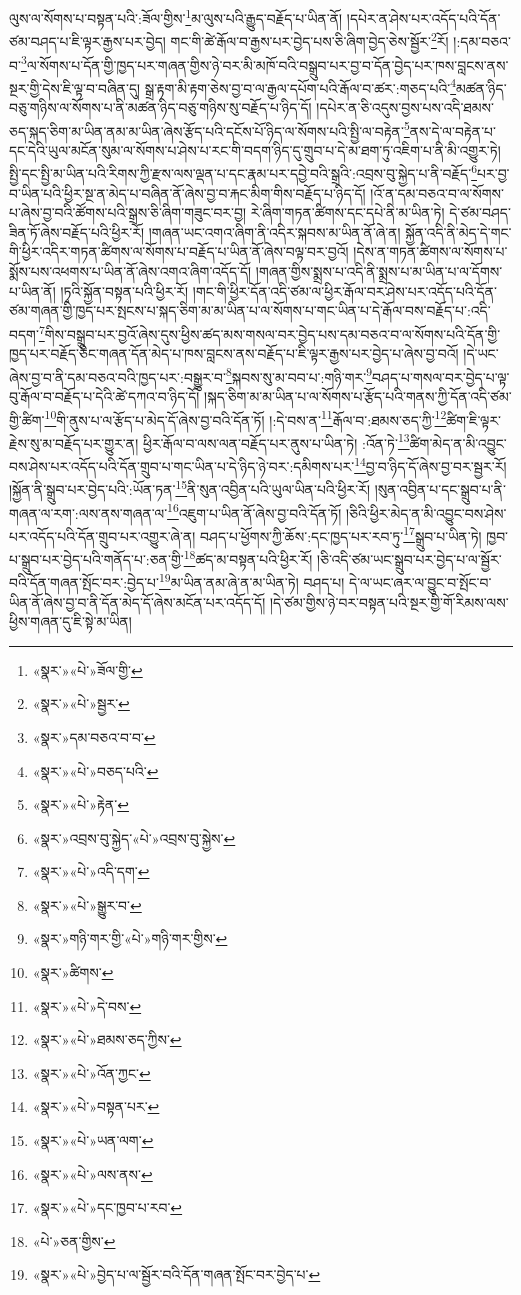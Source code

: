 ལུས་ལ་སོགས་པ་བསྟན་པའི་:ཟོལ་གྱིས་\footnote{«སྣར་»«པེ་»ཟོལ་གྱི་}མ་ལུས་པའི་རྒྱུད་བརྗོད་པ་ཡིན་ནོ། །དཔེར་ན་ཤེས་པར་འདོད་པའི་དོན་ཙམ་བཤད་པ་ཇི་ལྟར་རྒྱས་པར་བྱེད། གང་གི་ཚེ་རྒོལ་བ་རྒྱས་པར་བྱེད་པས་ཅི་ཞིག་བྱེད་ཅེས་སྦྱོར་\footnote{«སྣར་»«པེ་»སྦྱར་}རོ། །:དམ་བཅའ་བ་\footnote{«སྣར་»དམ་བཅའ་བ་བ་}ལ་སོགས་པ་དོན་གྱི་ཁྱད་པར་གཞན་གྱིས་ཉེ་བར་མི་མཁོ་བའི་བསྒྲུབ་པར་བྱ་བ་དོན་བྱེད་པར་ཁས་བླངས་ནས་སྔར་གྱི་དེས་ཇི་ལྟ་བ་བཞིན་དུ། སྒྲ་རྟག་མི་རྟག་ཅེས་བྱ་བ་ལ་རྒྱལ་དཔོག་པའི་རྒོལ་བ་ཚར་:གཅད་པའི་\footnote{«སྣར་»«པེ་»བཅད་པའི་}མཚན་ཉིད་བཅུ་གཉིས་ལ་སོགས་པ་ནི་མཚན་ཉིད་བཅུ་གཉིས་སུ་བརྗོད་པ་ཉིད་དོ། །དཔེར་ན་ཅི་འདུས་བྱས་པས་འདི་ཐམས་ཅད་སྐད་ཅིག་མ་ཡིན་ནམ་མ་ཡིན་ཞེས་རྩོད་པའི་དངོས་པོ་ཉིད་ལ་སོགས་པའི་སྤྱི་ལ་བརྟེན་\footnote{«སྣར་»«པེ་»རྟེན་}ནས་དེ་ལ་བརྟེན་པ་དང་དེའི་ཡུལ་མངོན་སུམ་ལ་སོགས་པ་ཤེས་པ་རང་གི་བདག་ཉིད་དུ་གྲུབ་པ་དེ་མ་ཐག་ཏུ་འཇིག་པ་ནི་མི་འགྱུར་ཏེ། སྤྱི་དང་སྤྱི་མ་ཡིན་པའི་རིགས་ཀྱི་རྫས་ལས་ལྡན་པ་དང་རྣམ་པར་དབྱེ་བའི་སྒྲའི་:འབྲས་བུ་སྐྱེད་པ་ནི་བརྗོད་\footnote{«སྣར་»འབྲས་བུ་སྐྱེད་«པེ་»འབྲས་བུ་སྐྱེས་}པར་བྱ་བ་ཡིན་པའི་ཕྱིར་སྔ་ན་མེད་པ་བཞིན་ནོ་ཞེས་བྱ་བ་རྐང་མིག་གིས་བརྗོད་པ་ཉིད་དོ། །འོ་ན་དམ་བཅའ་བ་ལ་སོགས་པ་ཞེས་བྱ་བའི་ཚོགས་པའི་སྒྲས་ཅི་ཞིག་གཟུང་བར་བྱ། རེ་ཞིག་གཏན་ཚིགས་དང་དཔེ་ནི་མ་ཡིན་ཏེ། དེ་ཙམ་བཤད་ཟིན་ཏོ་ཞེས་བརྗོད་པའི་ཕྱིར་རོ། །གཞན་ཡང་འགའ་ཞིག་ནི་འདིར་སྐབས་མ་ཡིན་ནོ་ཞེ་ན། སྐྱོན་འདི་ནི་མེད་དེ་གང་གི་ཕྱིར་འདིར་གཏན་ཚིགས་ལ་སོགས་པ་བརྗོད་པ་ཡིན་ནོ་ཞེས་བལྟ་བར་བྱའོ། །དེས་ན་གཏན་ཚིགས་ལ་སོགས་པ་སྨོས་པས་འཕགས་པ་ཡིན་ནོ་ཞེས་འགའ་ཞིག་འདོད་དོ། །གཞན་གྱིས་སྨྲས་པ་འདི་ནི་སྨྲས་པ་མ་ཡིན་པ་ལ་དོགས་པ་ཡིན་ནོ། །ཏྭའི་སྐྱོན་བསྟན་པའི་ཕྱིར་རོ། །གང་གི་ཕྱིར་དོན་འདི་ཙམ་ལ་ཕྱིར་རྒོལ་བར་ཤེས་པར་འདོད་པའི་དོན་ཙམ་གཞན་གྱི་ཁྱད་པར་སྤངས་པ་སྐད་ཅིག་མ་མ་ཡིན་པ་ལ་སོགས་པ་གང་ཡིན་པ་དེ་རྒོལ་བས་བརྗོད་པ་:འདི་བདག་\footnote{«སྣར་»«པེ་»འདི་དག་}གིས་བསྒྲུབ་པར་བྱའོ་ཞེས་དུས་ཕྱིས་ཚད་མས་གསལ་བར་བྱེད་པས་དམ་བཅའ་བ་ལ་སོགས་པའི་དོན་གྱི་ཁྱད་པར་བརྗོད་ཅིང་གཞན་དོན་མེད་པ་ཁས་བླངས་ནས་བརྗོད་པ་ཇི་ལྟར་རྒྱས་པར་བྱེད་པ་ཞེས་བྱ་བའོ། །དེ་ཡང་ཞེས་བྱ་བ་ནི་དམ་བཅའ་བའི་ཁྱད་པར་:བསྒྱུར་བ་\footnote{«སྣར་»«པེ་»སྒྱུར་བ་}སྐབས་སུ་མ་བབ་པ་:གཉི་གར་\footnote{«སྣར་»གཉི་གར་གྱི་«པེ་»གཉི་གར་གྱིས་}བཤད་པ་གསལ་བར་བྱེད་པ་ལྟ་བུ་རྒོལ་བ་བརྗོད་པ་དེའི་ཚེ་དཀའ་བ་ཉིད་དོ། །སྐད་ཅིག་མ་མ་ཡིན་པ་ལ་སོགས་པ་རྩོད་པའི་གནས་ཀྱི་དོན་འདི་ཙམ་གྱི་ཚིག་\footnote{«སྣར་»ཚིགས་}གི་ནུས་པ་ལ་རྩོད་པ་མེད་དོ་ཞེས་བྱ་བའི་དོན་ཏོ། །:དེ་བས་ན་\footnote{«སྣར་»«པེ་»དེ་བས་}རྒོལ་བ་:ཐམས་ཅད་ཀྱི་\footnote{«སྣར་»«པེ་»ཐམས་ཅད་ཀྱིས་}ཚིག་ཇི་ལྟར་རྗེས་སུ་མ་བརྗོད་པར་གྱུར་ན། ཕྱིར་རྒོལ་བ་ལས་ལན་བརྗོད་པར་ནུས་པ་ཡིན་ཏེ། :འོན་ཏེ་\footnote{«སྣར་»«པེ་»འོན་ཀྱང་}ཚིག་མེད་ན་མི་འབྱུང་བས་ཤེས་པར་འདོད་པའི་དོན་གྲུབ་པ་གང་ཡིན་པ་དེ་ཉིད་ཉེ་བར་:དམིགས་པར་\footnote{«སྣར་»«པེ་»བསྟན་པར་}བྱ་བ་ཉིད་དོ་ཞེས་བྱ་བར་སྦྱར་རོ། །སྐྱོན་ནི་སྒྲུབ་པར་བྱེད་པའི་:ཡོན་ཏན་\footnote{«སྣར་»«པེ་»ཡན་ལག་}ནི་སུན་འབྱིན་པའི་ཡུལ་ཡིན་པའི་ཕྱིར་རོ། །སུན་འབྱིན་པ་དང་སྒྲུབ་པ་ནི་གཞན་ལ་རག་:ལས་ནས་གཞན་ལ་\footnote{«སྣར་»«པེ་»ལས་ནས་}འཇུག་པ་ཡིན་ནོ་ཞེས་བྱ་བའི་དོན་ཏོ། །ཅིའི་ཕྱིར་མེད་ན་མི་འབྱུང་བས་ཤེས་པར་འདོད་པའི་དོན་གྲུབ་པར་འགྱུར་ཞེ་ན། བཤད་པ་ཕྱོགས་ཀྱི་ཆོས་:དང་ཁྱད་པར་རབ་ཏུ་\footnote{«སྣར་»«པེ་»དང་ཁྱབ་པ་རབ་}སྒྲུབ་པ་ཡིན་ཏེ། ཁྱབ་པ་སྒྲུབ་པར་བྱེད་པའི་གནོད་པ་:ཅན་གྱི་\footnote{«པེ་»ཅན་གྱིས་}ཚད་མ་བསྟན་པའི་ཕྱིར་རོ། །ཅི་འདི་ཙམ་ཡང་སྒྲུབ་པར་བྱེད་པ་ལ་སྦྱོར་བའི་དོན་གཞན་སྤོང་བར་:བྱེད་པ་\footnote{«སྣར་»«པེ་»བྱེད་པ་ལ་སྦྱོར་བའི་དོན་གཞན་སྤོང་བར་བྱེད་པ་}མ་ཡིན་ནམ་ཞེ་ན་མ་ཡིན་ཏེ། བཤད་པ། དེ་ལ་ཡང་ཞར་ལ་བྱུང་བ་སྤོང་བ་ཡིན་ནོ་ཞེས་བྱ་བ་ནི་དོན་མེད་དོ་ཞེས་མངོན་པར་འདོད་དོ། །དེ་ཙམ་གྱིས་ཉེ་བར་བསྟན་པའི་སྔར་གྱི་གོ་རིམས་ལས་ཕྱིས་གཞན་དུ་ཇི་སྟེ་མ་ཡིན། 